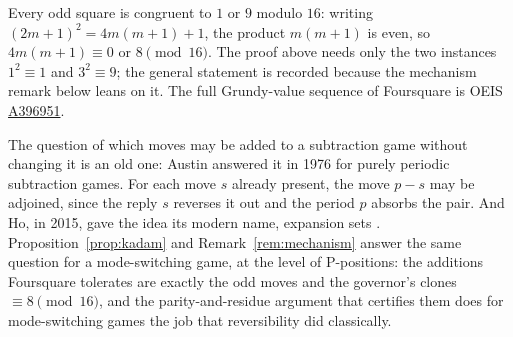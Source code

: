 \begin{remark}\label{rem:odd-squares}
Every odd square is congruent to $1$ or $9$ modulo $16$: writing
$(2m+1)^2 = 4m(m+1) + 1$, the product $m(m+1)$ is even, so $4m(m+1) \equiv
0$ or $8 \pmod{16}$. The proof above needs only the two instances
$1^2 \equiv 1$ and $3^2 \equiv 9$; the general statement is recorded
because the mechanism remark below leans on it. The full Grundy-value
sequence of Foursquare is OEIS
\href{https://oeis.org/A396951}{A396951}.
\end{remark}

The question of which moves may be added to a subtraction game without
changing it is an old one: Austin answered it in 1976 for purely
periodic subtraction games. For each move $s$ already present, the
move $p - s$ may be adjoined, since the reply $s$ reverses it out and
the period $p$ absorbs the pair. And Ho, in 2015, gave the idea its
modern name, expansion sets \cite{austin1976, ho2015}.
Proposition~\ref{prop:kadam} and Remark~\ref{rem:mechanism} answer the
same question for a mode-switching game, at the level of P-positions:
the additions Foursquare tolerates are exactly the odd moves and the
governor's clones $\equiv 8 \pmod{16}$, and the parity-and-residue
argument that certifies them does for mode-switching games the job that
reversibility did classically.

